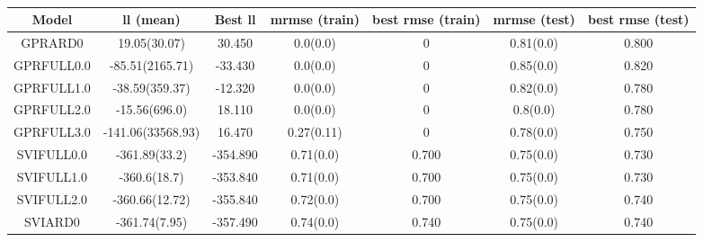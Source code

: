 \begin{table}
	\begin{center}
		\begin{tabular}{|c|c|c|c|c|c|c|}
			\hline
			Model & ll (mean) & Best ll & mrmse (train) & best rmse (train) & mrmse (test) & best rmse (test) \\
			\hline
			GPRARD0 & 19.05(30.07) & 30.450 & 0.0(0.0) & 0 & 0.81(0.0) & 0.800 \\
			\hline
			GPRFULL0.0 & -85.51(2165.71) & -33.430 & 0.0(0.0) & 0 & 0.85(0.0) & 0.820 \\
			\hline
			GPRFULL1.0 & -38.59(359.37) & -12.320 & 0.0(0.0) & 0 & 0.82(0.0) & 0.780 \\
			\hline
			GPRFULL2.0 & -15.56(696.0) & 18.110 & 0.0(0.0) & 0 & 0.8(0.0) & 0.780 \\
			\hline
			GPRFULL3.0 & -141.06(33568.93) & 16.470 & 0.27(0.11) & 0 & 0.78(0.0) & 0.750 \\
			\hline
			SVIFULL0.0 & -361.89(33.2) & -354.890 & 0.71(0.0) & 0.700 & 0.75(0.0) & 0.730 \\
			\hline
			SVIFULL1.0 & -360.6(18.7) & -353.840 & 0.71(0.0) & 0.700 & 0.75(0.0) & 0.730 \\
			\hline
			SVIFULL2.0 & -360.66(12.72) & -355.840 & 0.72(0.0) & 0.700 & 0.75(0.0) & 0.740 \\
			\hline
			SVIARD0 & -361.74(7.95) & -357.490 & 0.74(0.0) & 0.740 & 0.75(0.0) & 0.740 \\
			\hline
		\end{tabular}
	\end{center}
	\caption{}
\end{table}